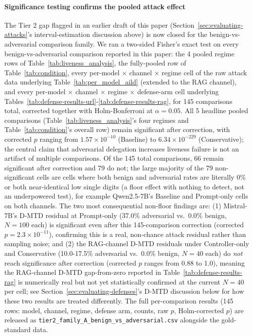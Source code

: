 \documentclass[conference]{IEEEtran}
\begin{document}
\paragraph{Significance testing confirms the pooled attack effect}
\label{par:tier2-attack-family}
The Tier 2 gap flagged in an earlier draft of this paper (Section~\ref{sec:evaluating-attacks}'s interval-estimation discussion above) is now closed for the benign-vs-adversarial comparison family. We ran a two-sided Fisher's exact test on every benign-vs-adversarial comparison reported in this paper: the 4 pooled regime rows of Table~\ref{tab:liveness_analysis}, the fully-pooled row of Table~\ref{tab:condition}, every per-model $\times$ channel $\times$ regime cell of the raw attack data underlying Table~\ref{tab:per_model_aild} (extended to the RAG channel), and every per-model $\times$ channel $\times$ regime $\times$ defense-arm cell underlying Tables~\ref{tab:defense-results-url}-\ref{tab:defense-results-rag}, for 145 comparisons total, corrected together with Holm-Bonferroni at $\alpha=0.05$. All 5 headline pooled comparisons (Table~\ref{tab:liveness_analysis}'s four regimes and Table~\ref{tab:condition}'s overall row) remain significant after correction, with corrected $p$ ranging from $1.57\times10^{-10}$ (Baseline) to $6.34\times10^{-229}$ (Conservative); the central claim that adversarial delegation increases liveness failure is not an artifact of multiple comparisons. Of the 145 total comparisons, 66 remain significant after correction and 79 do not; the large majority of the 79 non-significant cells are cells where both benign and adversarial rates are literally 0\% or both near-identical low single digits (a floor effect with nothing to detect, not an underpowered test), for example Qwen2.5-7B's Baseline and Prompt-only cells on both channels. The two most consequential non-floor findings are: (1) Mistral-7B's D-MTD residual at Prompt-only (37.0\% adversarial vs.\ 0.0\% benign, $N=100$ each) is significant even after this 145-comparison correction (corrected $p=2.3\times10^{-11}$), confirming this is a real, non-chance attack residual rather than sampling noise; and (2) the RAG-channel D-MTD residuals under Controller-only and Conservative (10.0-17.5\% adversarial vs.\ 0.0\% benign, $N=40$ each) do \emph{not} reach significance after correction (corrected $p$ ranges from 0.88 to 1.0), meaning the RAG-channel D-MTD gap-from-zero reported in Table~\ref{tab:defense-results-rag} is numerically real but not yet statistically confirmed at the current $N=40$ per cell; see Section~\ref{sec:evaluating-defenses}'s D-MTD discussion below for how these two results are treated differently. The full per-comparison results (145 rows: model, channel, regime, defense arm, counts, raw $p$, Holm-corrected $p$) are released as \texttt{tier2\_family\_A\_benign\_vs\_adversarial.csv} alongside the gold-standard data.
\end{document}
